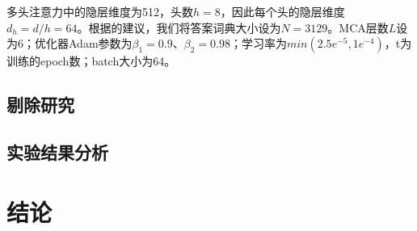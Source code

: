 多头注意力中的隐层维度为512，头数$h=8$，因此每个头的隐层维度$d_h=d/h=64$。根据的建议，我们将答案词典大小设为$N=3129$。MCA层数$L$设为6；优化器Adam参数为$\beta_1=0.9$、$\beta_2=0.98$；学习率为$min(2.5e^{-5}, 1e^{-4})$，t为训练的epoch数；batch大小为64。

\subsection{剔除研究}
\subsection{实验结果分析}

\section{结论}
